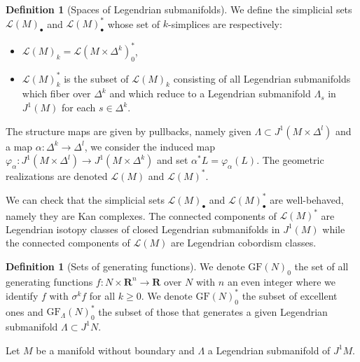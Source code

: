 \documentclass[12pt,a4paper]{article}
\numberwithin{equation}{section}
\theoremstyle{definition}
\newtheorem{dfn}[equation]{Definition}
\theoremstyle{remark}
\newcommand{\R}{\mathbf{R}}
\newcommand{\LL}{\mathcal{L}}
\newcommand{\GF}{\mathrm{GF}}
\begin{document}
\begin{dfn}[Spaces of Legendrian submanifolds]\label{dfn:spaceLeg}
We define the simplicial sets $\LL(M)_\bullet$ and $\LL(M)_\bullet^*$ whose set of $k$-simplices
are respectively:
\begin{itemize}
\item $\LL(M)_k=\LL(M\times \Delta^k)_0^*$,
\item $\LL(M)_k^*$ is the subset of $\LL(M)_k$ consisting of all Legendrian submanifolds
which fiber over $\Delta^k$ and which reduce to a Legendrian submanifold $\Lambda_s$ in $J^1(M)$ for each $s\in \Delta^k$.
\end{itemize}
The structure maps are given by pullbacks, namely given $\Lambda \subset J^1(M\times \Delta^l)$
and a map $\alpha:\Delta^k\to \Delta^l$, we consider the induced map $\varphi_\alpha:J^1(M\times \Delta^l)\to J^1(M\times \Delta^k)$
and set $\alpha^* L=\varphi_\alpha(L)$.
The geometric realizations are denoted $\LL(M)$ and $\LL(M)^*$.
\end{dfn}
We can check that the simplicial sets $\LL(M)_\bullet$ and $\LL(M)^*_\bullet$ are well-behaved, namely they are Kan complexes.
The connected components of $\LL(M)^*$ are Legendrian isotopy classes of closed Legendrian submanifolds
in $J^1(M)$ while the connected components of $\LL(M)$ are Legendrian cobordism classes.


\begin{dfn}[Sets of generating functions]\label{dfn:setGF}
We denote $\GF(N)_0$ the set of all generating functions $f:N\times \R^n \to \R$ over $N$ with $n$ an even integer
where we identify $f$ with $\sigma^k f$ for all $k\geq 0$.
We denote $\GF(N)_0^*$ the subset of excellent ones and $\GF_\Lambda(N)_0^*$ the subset of those that generates a given
Legendrian submanifold $\Lambda\subset J^1 N$.
\end{dfn}

Let $M$ be a manifold without boundary and $\Lambda$ a Legendrian submanifold of $J^1 M$.
\end{document}
